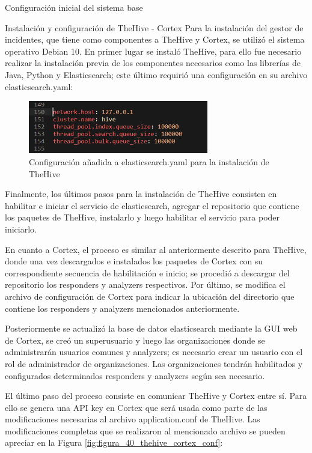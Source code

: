 \begin{section}{Configuración inicial del sistema base}
      
   
   
   
   
        \begin{subsection}{Instalación y configuración de TheHive - Cortex}
        Para la instalación del gestor de incidentes, que tiene como componentes a  TheHive y Cortex, se utilizó  el sistema operativo Debian 10. En primer lugar se instaló TheHive, para ello fue necesario realizar la instalación previa de los componentes necesarios como las librerías de Java, Python y Elasticsearch; este último requirió una configuración en su archivo elasticsearch.yaml:
        
        \begin{figure}[H]
            \centering
            \includegraphics[width=0.7\textwidth]{./iteracion_1_imagenes/figura_39_thehive_conf_elastic.png}
            \caption{Configuración añadida a elasticsearch.yaml para la instalación de TheHive}
            \label{fig:figura_39_thehive_conf}
        \end{figure}
        Finalmente, los últimos pasos para la instalación de TheHive consisten en habilitar e iniciar el servicio de elasticsearch, agregar el repositorio que contiene los paquetes de TheHive, instalarlo y luego habilitar el servicio para poder iniciarlo. \par
        En cuanto a Cortex, el proceso es similar al anteriormente descrito para TheHive, donde una vez descargados e instalados los paquetes de Cortex con su correspondiente secuencia de habilitación e inicio; se procedió a descargar del repositorio los responders y analyzers respectivos. Por último, se modifica el archivo de configuración de Cortex para indicar la ubicación del directorio que contiene los responders y analyzers mencionados anteriormente. \par
        Posteriormente se actualizó la base de datos elasticsearch mediante la GUI web de Cortex, se creó un superusuario y luego las organizaciones donde se administrarán usuarios comunes y analyzers; es necesario crear un usuario con el rol de administrador de organizaciones. Las organizaciones tendrán habilitados y configurados determinados responders y analyzers según sea necesario. \par
        El último paso del proceso consiste en comunicar TheHive y Cortex entre sí. Para ello se genera una API key en Cortex que será usada como parte de las modificaciones necesarias al archivo application.conf de TheHive. Las modificaciones completas que se realizaron al mencionado archivo se pueden apreciar en la Figura \ref{fig:figura_40_thehive_cortex_conf}:\par
        

\end{subsection}
\end{section}
